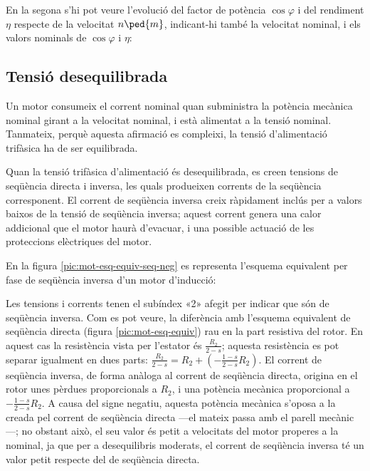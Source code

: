 \begin{exemple}
	En la segona s'hi pot veure l'evolució del factor de potència $\cos\varphi$ i del rendiment $\eta$ respecte de la velocitat $n\ped{m}$, indicant-hi també la  velocitat nominal, i els valors nominals de $\cos\varphi$ i $\eta$:
	\vspace{-3mm}
	\begin{center}
	\fontsize{10pt}{11pt}\selectfont
	
	\end{center}	

\end{exemple}

\subsection{Tensió desequilibrada}\label{sec:mot-tens-deseq}

Un motor consumeix el corrent nominal quan subministra la potència mecànica nominal girant a la velocitat nominal, i està alimentat a la tensió nominal. Tanmateix, perquè aquesta afirmació es compleixi, la tensió d'alimentació trifàsica ha de ser equilibrada.

Quan la tensió trifàsica d'alimentació és desequilibrada, es creen tensions de seqüència directa i inversa, les quals  produeixen corrents de la seqüència corresponent. El corrent de seqüència inversa creix ràpidament inclús per a valors baixos de  la tensió de seqüència inversa; aquest corrent genera una calor addicional que el motor haurà d'evacuar, i una possible actuació de les proteccions elèctriques del motor.

En la figura \vref{pic:mot-esq-equiv-seq-neg} es representa l'esquema equivalent per fase de seqüència inversa d'un   motor d'inducció:
\vspace{-2mm}
\begin{center}
	
	\label{pic:mot-esq-equiv-seq-neg}
\end{center}

Les tensions i corrents tenen el subíndex «2» afegit per indicar que són de seqüència inversa. Com es pot veure, la diferència amb l'esquema equivalent de seqüència directa (figura \vref{pic:mot-esq-equiv}) rau en la part resistiva del rotor. En aquest cas la resistència vista per l'estator és $\frac{R_2}{2-s}$; aquesta resistència es pot separar igualment en dues parts: $\frac{R_2}{2-s} = R_2 + \left(-\frac{1-s}{2-s} R_2\right)$. El corrent de seqüència inversa, de forma anàloga al corrent de seqüència directa,  origina en el rotor unes pèrdues proporcionals a  $R_2$, i una potència mecànica proporcional a $- \frac{1-s}{2-s} R_2$. A causa del signe negatiu, aquesta potència mecànica  s'oposa a la  creada pel corrent de seqüència directa ---el mateix passa amb el parell mecànic---; no obstant això, el seu valor és petit a velocitats del motor properes a la nominal, ja que per a desequilibris moderats, el corrent de seqüència inversa té un valor petit respecte del de seqüència directa.

